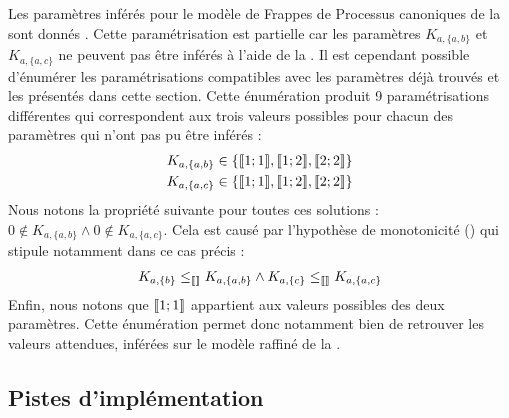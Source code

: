 \begin{example}
  Les paramètres inférés pour le modèle de Frappes de Processus canoniques de la
   sont donnés .
  Cette paramétrisation est partielle car les paramètres
  $K_{a,\{a,b\}}$ et $K_{a,\{a,c\}}$ ne peuvent pas être inférés à l'aide de la
  .
  Il est cependant possible d'énumérer les paramétrisations compatibles avec les paramètres
  déjà trouvés et les \enumparamcr{}
  présentés dans cette section.
  Cette énumération produit 9 paramétrisations différentes qui correspondent aux
  trois valeurs possibles pour chacun des paramètres qui n'ont pas pu être inférés :
  \begin{align*}
    K_{a,\{a,b\}} &\in \{ \mathopen{\llbracket}1\mathclose{};1\mathclose{\rrbracket}, \mathopen{\llbracket}1\mathclose{};2\mathclose{\rrbracket}, \mathopen{\llbracket}2\mathclose{};2\mathclose{\rrbracket} \} \\
    K_{a,\{a,c\}} &\in \{ \mathopen{\llbracket}1\mathclose{};1\mathclose{\rrbracket}, \mathopen{\llbracket}1\mathclose{};2\mathclose{\rrbracket}, \mathopen{\llbracket}2\mathclose{};2\mathclose{\rrbracket} \}
  \end{align*}
  Nous notons la propriété suivante pour toutes ces solutions :
  $0 \notin K_{a,\{a,b\}} \wedge 0 \notin K_{a,\{a,c\}}$.
  Cela est causé par l'hypothèse de monotonicité ()
  qui stipule notamment dans ce cas précis :
  \begin{align*}
    K_{a,\{b\}} \leq_{\llbracket\rrbracket} K_{a,\{a,b\}} \wedge
    K_{a,\{c\}} \leq_{\llbracket\rrbracket} K_{a,\{a,c\}}
  \end{align*}
  Enfin, nous notons que $\mathopen{\llbracket}1\mathclose{};1\mathclose{\rrbracket}$ appartient aux valeurs possibles des deux paramètres.
  Cette énumération permet donc notamment bien de retrouver les valeurs attendues,
  inférées sur le modèle raffiné de la .
\end{example}



\subsection{Pistes d'implémentation}

\newcommand{\atom}[1]{#1}
\newcommand{\predicate}[1]{\mathit{#1}}
\newcommand{\la}{\leftarrow}
\newcommand{\var}[1]{#1}
\newcommand{\nota}{\neg}

\newcommand{\paramlabel}{\predicate{param\_label}}
\newcommand{\paramres}{\predicate{param\_resource}}
\newcommand{\component}{\predicate{component}}
\newcommand{\componentlevels}{\predicate{component\_levels}}
\newcommand{\param}{\predicate{param}}
\newcommand{\inferedparam}{\predicate{infered\_param}}
\newcommand{\lessactive}{\predicate{less\_active}}
\newcommand{\paraminf}{\predicate{param\_inf}}

